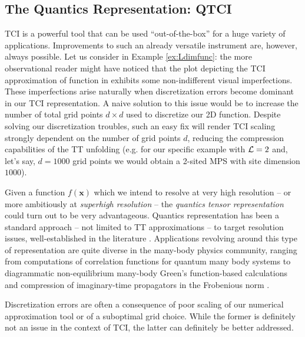 \subsection{The Quantics Representation: QTCI}
TCI is a powerful tool that can be used ``out-of-the-box'' for a huge variety of applications. Improvements to such an already versatile instrument are, however, always possible. Let us consider  in Example \ref{ex:Ldimfunc}: the more observational reader might have noticed that the plot depicting the TCI approximation of function in  exhibits some non-indifferent visual imperfections. These imperfections arise naturally when discretization errors become dominant in our TCI representation. A naive solution to this issue would be to increase the number of total grid points $d\times d$ used to discretize our 2D function. Despite solving our discretization troubles, such an easy fix will render TCI scaling strongly dependent on the number of grid points $d$, reducing the compression capabilities of the TT unfolding (e.g. for our specific example with $\mathcal{L} = 2$ and, let's say, $d=1000$ grid points we would obtain a 2-sited MPS with site dimension $1000$). 

Given a function $f(\boldsymbol{x})$ which we intend to resolve at very high resolution -- or more ambitiously at \textit{superhigh resolution} -- the \textit{quantics tensor representation} could turn out to be very advantageous. Quantics representation has been a standard approach -- not limited to TT approximations -- to target resolution issues, well-established in the literature \cite{Oseledets2009, Khoromskij2011, Hiroshi2023, Takahashi2025, Murray2024, Ritter2024}. Applications revolving around this type of representation are quite diverse in the many-body physics community, ranging from computations of correlation functions for quantum many body systems \cite{Hiroshi2023} to diagrammatic non-equilibrium many-body Green’s function-based calculations \cite{Murray2024} and compression of imaginary-time propagators in the Frobenious norm \cite{Takahashi2025}.

Discretization errors are often a consequence of poor scaling of our numerical approximation tool or of a suboptimal grid choice. While the former is definitely not an issue in the context of TCI, the latter can definitely be better addressed.

